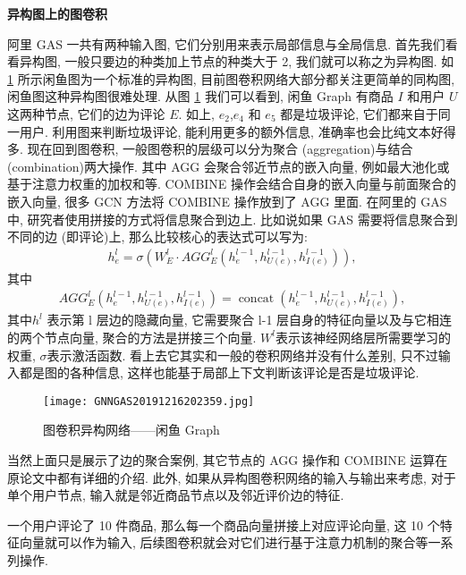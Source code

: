 \textbf{异构图上的图卷积}

阿里 GAS 一共有两种输入图, 它们分别用来表示局部信息与全局信息. 首先我们看看异构图, 一般只要边的种类加上节点的种类大于 2, 我们就可以称之为异构图.
如 \ref{GNNGAS20191216202359} 所示闲鱼图为一个标准的异构图, 目前图卷积网络大部分都关注更简单的同构图, 闲鱼图这种异构图很难处理.
从图 \ref{GNNGAS20191216202359} 我们可以看到, 闲鱼 Graph 有商品 $I$ 和用户 $U$ 这两种节点, 它们的边为评论 $E$.
如上, $e_2$,$e_4$ 和 $e_5$ 都是垃圾评论, 它们都来自于同一用户. 利用图来判断垃圾评论, 能利用更多的额外信息, 准确率也会比纯文本好得多.
现在回到图卷积, 一般图卷积的层级可以分为聚合 (aggregation)与结合 (combination)两大操作.
其中 AGG 会聚合邻近节点的嵌入向量, 例如最大池化或基于注意力权重的加权和等.
COMBINE 操作会结合自身的嵌入向量与前面聚合的嵌入向量, 很多 GCN 方法将 COMBINE 操作放到了 AGG 里面.
在阿里的 GAS 中, 研究者使用拼接的方式将信息聚合到边上. 比如说如果 GAS 需要将信息聚合到不同的边 (即评论)上, 那么比较核心的表达式可以写为:
\begin{align}
    h_{e}^{l}=\sigma\left (W_{E}^{l} \cdot A G G_{E}^{l}\left (h_{e}^{l-1}, h_{U (e)}^{l-1}, h_{I (e)}^{l-1}\right)\right),
\end{align}
其中
\begin{align*}
    A G G_{E}^{l}\left (h_{e}^{l-1}, h_{U (e)}^{l-1}, h_{I (e)}^{l-1}\right)=\operatorname{concat}\left (h_{e}^{l-1}, h_{U (e)}^{l-1}, h_{I (e)}^{l-1}\right),
\end{align*}
其中$ h^l$ 表示第 l 层边的隐藏向量, 它需要聚合 l-1 层自身的特征向量以及与它相连的两个节点向量, 聚合的方法是拼接三个向量.
$W^l$表示该神经网络层所需要学习的权重, $\sigma$表示激活函数.
看上去它其实和一般的卷积网络并没有什么差别, 只不过输入都是图的各种信息, 这样也能基于局部上下文判断该评论是否是垃圾评论.
\begin{figure}[H]
    \centering
    \texttt{[image: GNNGAS20191216202359.jpg]}
    \caption{图卷积异构网络——闲鱼 Graph}
    \label{GNNGAS20191216202359}
    \vspace{-0.4cm}
\end{figure}
当然上面只是展示了边的聚合案例, 其它节点的 AGG 操作和 COMBINE 运算在原论文中都有详细的介绍.
此外, 如果从异构图卷积网络的输入与输出来考虑,
对于单个用户节点, 输入就是邻近商品节点以及邻近评价边的特征.
\begin{example}
    一个用户评论了 10 件商品, 那么每一个商品向量拼接上对应评论向量, 这 10 个特征向量就可以作为输入, 后续图卷积就会对它们进行基于注意力机制的聚合等一系列操作.
\end{example}

